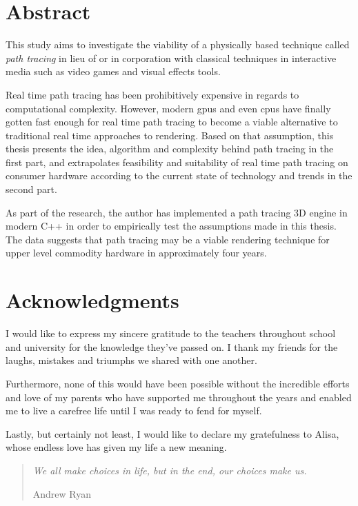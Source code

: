 \documentclass[
  twoside,
  11pt, a4paper,
  footinclude=true,
  headinclude=true,
  cleardoublepage=empty
]{scrreprt}
\begin{document}


\setlength{\parindent}{1em}
\setlength{\parskip}{0.5em}

\chapter*{Abstract}
\onehalfspace
This study aims to investigate the viability of a physically based technique called
\emph{path tracing} in lieu of or in corporation with classical techniques in interactive media
such as video games and visual effects tools.

Real time path tracing has been prohibitively expensive in regards to computational complexity.
However, modern \acs{gpu}s and even \acs{cpu}s have finally gotten fast enough for real time path
tracing to become a viable alternative to traditional real time approaches to rendering.  Based on
that assumption, this thesis presents the idea, algorithm and complexity behind path tracing in the
first part, and extrapolates feasibility and suitability of real time path tracing on consumer
hardware according to the current state of technology and trends in the second part.

As part of the research, the author has implemented a path tracing 3D engine in modern C++ in order
to empirically test the assumptions made in this thesis. The data suggests that path tracing may be a
viable rendering technique for upper level commodity hardware in approximately four years.
\singlespace

\chapter*{Acknowledgments}
\doublespacing
I would like to express my sincere gratitude to the teachers throughout school and university for
the knowledge they've passed on.
I thank my friends for the laughs, mistakes and triumphs we shared with one another.

Furthermore, none of this would have been possible without the incredible efforts and love of my
parents who have supported me throughout the years and enabled me to live a carefree life until I
was ready to fend for myself.

Lastly, but certainly not least, I would like to declare my gratefulness to Alisa, whose endless love
has given my life a new meaning.

\singlespace

\clearpage
\vspace*{\fill}
\thispagestyle{empty} %
\begin{quotation}
    \em
    We all make choices in life, but in the end, our choices make us.

    \medskip
    \raggedleft
    Andrew Ryan
\end{quotation}
\vspace*{\fill}
\end{document}

